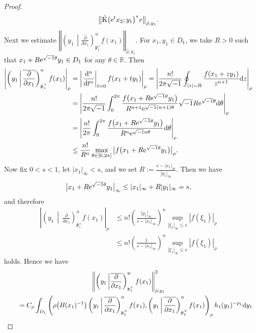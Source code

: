 \documentclass[pdftex]{sigma}
\numberwithin{equation}{section}
\newcommand{\ds}{\displaystyle}
\newcommand{\BR}{\mathbb{R}}
\newcommand{\fp}{\mathfrak{p}}
\newcommand{\rK}{\mathrm{K}}
\begin{document}
\begin{proof}
\begin{gather*}
\big\Vert\hat{\rK}\big({\rm e}^tx_2;y_1\big)^*v\big\Vert_{\hat{\rho},y_1}.
\end{gather*}
Next we estimate
$\ds \left\Vert\left(y_1\,\middle|\overline{\frac{\partial}{\partial x_1}}\right)_{\fp^+_1}^nf(x_1)\right\Vert_{\hat{\rho},y_1}$.
For $x_1,y_1\in D_1$, we take $R>0$ such that $x_1+R{\rm e}^{\sqrt{-1}\theta}y_1\in D_1$ for any $\theta\in\BR$. Then
\begin{align*}
\left|\left(y_1\,\middle|\,\overline{\frac{\partial}{\partial x_1}}\right)_{\fp^+_1}^nf(x_1)\right|_\rho
&=\left|\left.\frac{{\rm d}^n}{{\rm d}t^n}\right|_{t=0}f(x_1+ty_1)\right|_\rho
=\left|\frac{n!}{2\pi\sqrt{-1}}\oint_{|z|=R}\frac{f(x_1+zy_1)}{z^{n+1}}{\rm d}z\right|_\rho \\
&=\left|\frac{n!}{2\pi\sqrt{-1}}\int_0^{2\pi}\frac{f\big(x_1+R{\rm e}^{\sqrt{-1}\theta}y_1\big)}{R^{n+1}{\rm e}^{\sqrt{-1}(n+1)\theta}}
\sqrt{-1}R{\rm e}^{\sqrt{-1}\theta}{\rm d}\theta\right|_\rho \\
&=\left|\frac{n!}{2\pi}\int_0^{2\pi}\frac{f\big(x_1+R{\rm e}^{\sqrt{-1}\theta}y_1\big)}{R^n{\rm e}^{\sqrt{-1}n\theta}}{\rm d}\theta\right|_\rho\\
& \le \frac{n!}{R^n}\max_{\theta\in[0,2\pi]}\big|f\big(x_1+R{\rm e}^{\sqrt{-1}\theta}y_1\big)\big|_\rho.
\end{align*}
Now fix $0<s<1$, let $|x_1|_\infty<s$, and we set $\ds R:=\frac{s-|x_1|_\infty}{|y_1|_\infty}$. Then we have
\begin{gather*} \big|x_1+R{\rm e}^{\sqrt{-1}\theta}y_1\big|_\infty\le |x_1|_\infty+R|y_1|_\infty=s, \end{gather*}
and therefore
\begin{align*}
\left|\left(y_1\,\middle|\,\overline{\frac{\partial}{\partial x_1}}\right)_{\fp^+_1}^nf(x_1)\right|_\rho
&\le n!\left(\frac{|y_1|_\infty}{s-|x_1|_\infty}\right)^n\sup_{|\xi_1|_\infty\le s}|f(\xi_1)|_\rho \\
&\le n!\left(\frac{1}{s-|x_1|_\infty}\right)^n\sup_{|\xi_1|_\infty\le s}|f(\xi_1)|_\rho
\end{align*}
holds. Hence we have
\begin{gather}
 \left\Vert\left(y_1\,\middle|\overline{\frac{\partial}{\partial x_1}}\right)_{\fp^+_1}^nf(x_1)\right\Vert_{\hat{\rho},y_1}^2 \notag \\
\qquad{} =C_\rho\int_{D_1} \left(\rho\big(B(x_1)^{-1}\big)\left(y_1\,\middle|\,\overline{\frac{\partial}{\partial x_1}}\right)_{\fp^+_1}^nf(x_1)
,\left(y_1\,\middle|\,\overline{\frac{\partial}{\partial x_1}}\right)_{\fp^+_1}^nf(x_1)\right)_\rho h_1(y_1)^{-p_1}{\rm d}y_1 \notag \\

\end{gather}
\end{proof}
\end{document}
